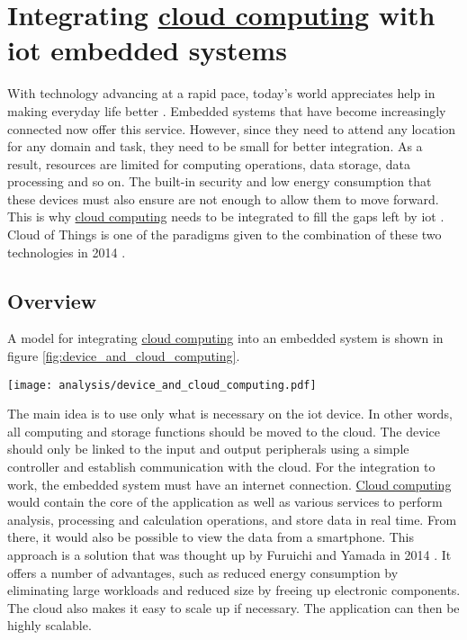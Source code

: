 \section{Integrating \texorpdfstring{\hyperref[subsec:cloudcomputing]{cloud computing}}{} with \texorpdfstring{\acrshort{iot}}{} embedded systems}

With technology advancing at a rapid pace, today's world appreciates help in making everyday life better \cite{state_of_the_art_integration_iot_cloudComputing}. Embedded systems that have become increasingly connected now offer this service. However, since they need to attend any location for any domain and task, they need to be small for better integration. As a result, resources are limited for computing operations, data storage, data processing and so on. The built-in security and low energy consumption that these devices must also ensure are not enough to allow them to move forward. This is why \hyperref[subsec:cloudcomputing]{cloud computing} needs to be integrated to fill the gaps left by \acrshort{iot} \cite{state_of_the_art_integration_iot_cloudComputing}. Cloud of Things is one of the paradigms given to the combination of these two technologies in 2014 \cite{cloud_of_thing}.

\subsection{Overview}
A model for integrating \hyperref[subsec:cloudcomputing]{cloud computing} into an embedded system is shown in figure \ref{fig:device_and_cloud_computing}.
\begin{center}
    \begingroup
    \texttt{[image: analysis/device\_and\_cloud\_computing.pdf]}
    \label{fig:device_and_cloud_computing}
    \endgroup
\end{center}
The main idea is to use only what is necessary on the \acrshort{iot} device. In other words, all computing and storage functions should be moved to the \gls{cloud}. The device should only be linked to the input and output peripherals using a simple controller and establish communication with the \gls{cloud}. For the integration to work, the embedded system must have an internet connection. \hyperref[subsec:cloudcomputing]{Cloud computing} would contain the core of the application as well as various services to perform analysis, processing and calculation operations, and store data in real time. From there, it would also be possible to view the data from a smartphone. This approach is a solution that was thought up by Furuichi and Yamada in 2014 \cite{next_generation_iot_cloud}. It offers a number of advantages, such as reduced energy consumption by eliminating large workloads and reduced size by freeing up electronic components. The \gls{cloud} also makes it easy to scale up if necessary. The application can then be highly scalable. \cite{integration_embedded_systems_cloudComputing}

